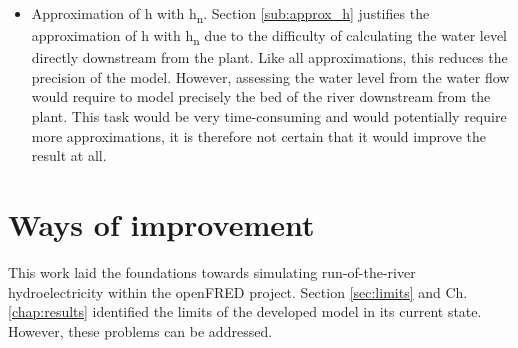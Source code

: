 \begin{itemize}
 \item Approximation of h with h\textsubscript{n}. Section \ref{sub:approx_h} justifies the approximation of h with h\textsubscript{n} due to the difficulty of calculating the water level directly downstream from the plant.  Like all approximations, this reduces the precision of the model. However, assessing the water level from the water flow would require to model precisely the bed of the river downstream from the plant. This task would be very time-consuming and would potentially require more approximations, it is therefore not certain that it would improve the result at all.
\end{itemize}


\section{Ways of improvement}
\label{sec:improv}

This work laid the foundations towards simulating run-of-the-river hydroelectricity within the openFRED project. Section \ref{sec:limits} and Ch. \ref{chap:results} identified the limits of the developed model in its current state. However, these problems can be addressed.

